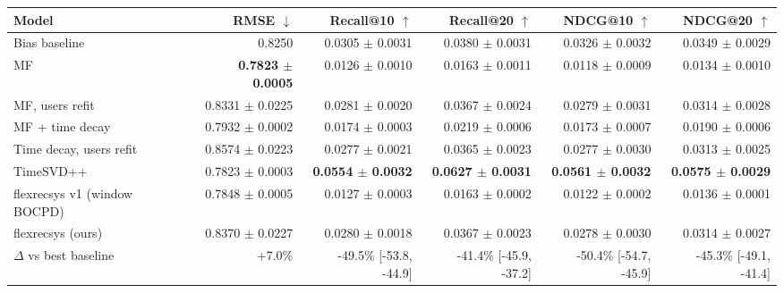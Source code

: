 \begin{tabular}{lrrrrr}
\toprule
Model & RMSE $\downarrow$ & Recall@10 $\uparrow$ & Recall@20 $\uparrow$ & NDCG@10 $\uparrow$ & NDCG@20 $\uparrow$ \\
\midrule
Bias baseline & 0.8250 & 0.0305 $\pm$ 0.0031 & 0.0380 $\pm$ 0.0031 & 0.0326 $\pm$ 0.0032 & 0.0349 $\pm$ 0.0029 \\
MF & \textbf{0.7823 $\pm$ 0.0005} & 0.0126 $\pm$ 0.0010 & 0.0163 $\pm$ 0.0011 & 0.0118 $\pm$ 0.0009 & 0.0134 $\pm$ 0.0010 \\
MF, users refit & 0.8331 $\pm$ 0.0225 & 0.0281 $\pm$ 0.0020 & 0.0367 $\pm$ 0.0024 & 0.0279 $\pm$ 0.0031 & 0.0314 $\pm$ 0.0028 \\
MF + time decay & 0.7932 $\pm$ 0.0002 & 0.0174 $\pm$ 0.0003 & 0.0219 $\pm$ 0.0006 & 0.0173 $\pm$ 0.0007 & 0.0190 $\pm$ 0.0006 \\
Time decay, users refit & 0.8574 $\pm$ 0.0223 & 0.0277 $\pm$ 0.0021 & 0.0365 $\pm$ 0.0023 & 0.0277 $\pm$ 0.0030 & 0.0313 $\pm$ 0.0025 \\
TimeSVD++ & 0.7823 $\pm$ 0.0003 & \textbf{0.0554 $\pm$ 0.0032} & \textbf{0.0627 $\pm$ 0.0031} & \textbf{0.0561 $\pm$ 0.0032} & \textbf{0.0575 $\pm$ 0.0029} \\
flexrecsys v1 (window BOCPD) & 0.7848 $\pm$ 0.0005 & 0.0127 $\pm$ 0.0003 & 0.0163 $\pm$ 0.0002 & 0.0122 $\pm$ 0.0002 & 0.0136 $\pm$ 0.0001 \\
flexrecsys (ours) & 0.8370 $\pm$ 0.0227 & 0.0280 $\pm$ 0.0018 & 0.0367 $\pm$ 0.0023 & 0.0278 $\pm$ 0.0030 & 0.0314 $\pm$ 0.0027 \\
\midrule
$\Delta$ vs best baseline & +7.0\% & -49.5\% [-53.8, -44.9] & -41.4\% [-45.9, -37.2] & -50.4\% [-54.7, -45.9] & -45.3\% [-49.1, -41.4] \\
\bottomrule
\end{tabular}
